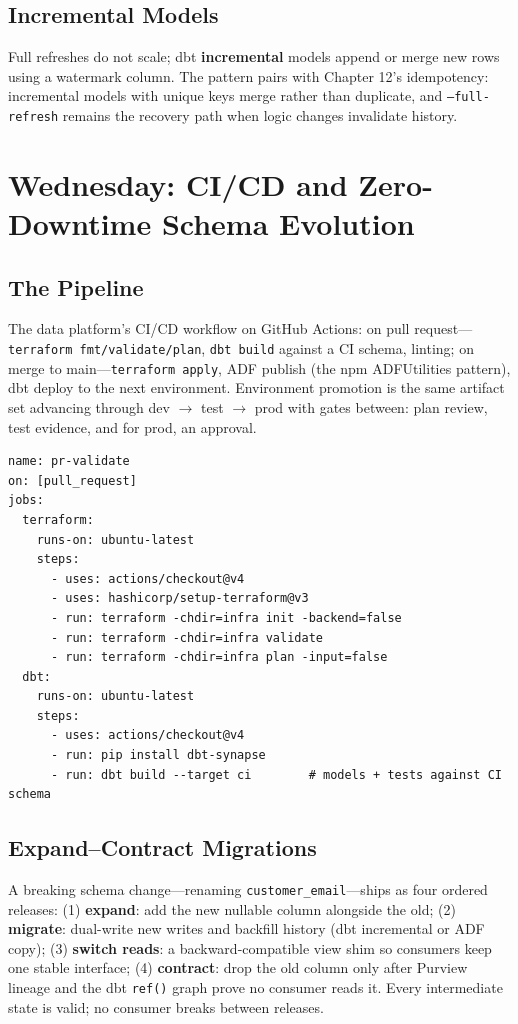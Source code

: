 \subsection{Incremental Models}
Full refreshes do not scale; dbt \textbf{incremental} models append or merge new rows using a watermark column. The pattern pairs with Chapter 12's idempotency: incremental models with unique keys merge rather than duplicate, and \texttt{--full-refresh} remains the recovery path when logic changes invalidate history.

\section{Wednesday: CI/CD and Zero-Downtime Schema Evolution}

\subsection{The Pipeline}
The data platform's CI/CD workflow on GitHub Actions: on pull request---\texttt{terraform fmt/validate/plan}, \texttt{dbt build} against a CI schema, linting; on merge to main---\texttt{terraform apply}, ADF publish (the npm ADFUtilities pattern), dbt deploy to the next environment. Environment promotion is the same artifact set advancing through dev $\rightarrow$ test $\rightarrow$ prod with gates between: plan review, test evidence, and for prod, an approval.

\begin{lstlisting}[language={},caption={Pull-request validation workflow (excerpt).},label={lst:ch24-actions}]
name: pr-validate
on: [pull_request]
jobs:
  terraform:
    runs-on: ubuntu-latest
    steps:
      - uses: actions/checkout@v4
      - uses: hashicorp/setup-terraform@v3
      - run: terraform -chdir=infra init -backend=false
      - run: terraform -chdir=infra validate
      - run: terraform -chdir=infra plan -input=false
  dbt:
    runs-on: ubuntu-latest
    steps:
      - uses: actions/checkout@v4
      - run: pip install dbt-synapse
      - run: dbt build --target ci        # models + tests against CI schema
\end{lstlisting}

\subsection{Expand--Contract Migrations}
A breaking schema change---renaming \texttt{customer\_email}---ships as four ordered releases: (1) \textbf{expand}: add the new nullable column alongside the old; (2) \textbf{migrate}: dual-write new writes and backfill history (dbt incremental or ADF copy); (3) \textbf{switch reads}: a backward-compatible view shim so consumers keep one stable interface; (4) \textbf{contract}: drop the old column only after Purview lineage and the dbt \texttt{ref()} graph prove no consumer reads it. Every intermediate state is valid; no consumer breaks between releases.

